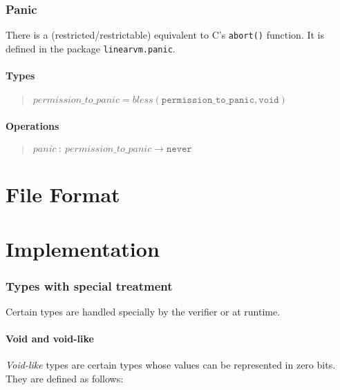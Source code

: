 \documentclass[a4paper]{book}
\newcommand\TypeDefinition[1]{\begin{quote}$\mathit{#1}$\end{quote}}
\newcommand\FuncSignature[2]{\begin{quote}$\mathit{#1}\ :\ \mathit{#2}$\end{quote}}
\begin{document}
\section{Panic}

There is a (restricted/restrictable) equivalent to C's \texttt{abort()} function.
It is defined in the package \texttt{linearvm.panic}.

\subsection*{Types}
\TypeDefinition{permission\_to\_panic = bless(\texttt{permission\_to\_panic}, \texttt{void})}

\subsection*{Operations}
\FuncSignature{panic}{permission\_to\_panic \to \texttt{never}}


\part{File Format}

\part{Implementation}

\section{Types with special treatment}

Certain types are handled specially by the verifier or at runtime.

\subsection{Void and void-like}
\emph{Void-like} types are certain types whose values can be
represented in zero bits.
They are defined as follows:
\end{document}
